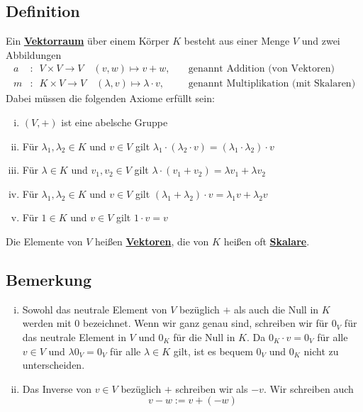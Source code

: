 \subsection{Definition}
Ein \underline{\textbf{Vektorraum}} über einem Körper $K$ besteht aus einer Menge $V$ und zwei Abbildungen
\begin{align*}
a &: \enspace V \times V \to V \quad (v,w) \mapsto v + w , \quad &\text{genannt Addition (von Vektoren)} \\
m &: \enspace K \times V \to V \quad (\lambda, v) \mapsto \lambda \cdot v  , \quad &\text{genannt Multiplikation (mit Skalaren)}
\end{align*}
Dabei müssen die folgenden Axiome erfüllt sein:
\begin{enumerate}[i)]
\item $(V,+)$ ist eine abelsche Gruppe

\item Für $\lambda_1 , \lambda_2 \in K$ und $v \in V$ gilt 
$\lambda_1 \cdot ( \lambda_2 \cdot v )=(\lambda_1 \cdot \lambda_2) \cdot v$

\item Für $\lambda \in K$ und $v_1, v_2 \in V$ gilt 
$\lambda \cdot ( v_1 + v_2 )= \lambda v_1 + \lambda v_2 $

\item Für $\lambda_1 , \lambda_2 \in K$ und $v \in V$ gilt 
$( \lambda_1 + \lambda_2 ) \cdot v = \lambda_1 v + \lambda_2 v$

\item Für $1 \in K$ und $v \in V$ gilt $1 \cdot v = v$
\end{enumerate}
Die Elemente von $V$ heißen \underline{\textbf{Vektoren}}, die von $K$ heißen oft \underline{\textbf{Skalare}}.

\subsection{Bemerkung}
\begin{enumerate}[i)]
\item Sowohl das neutrale Element von $V$ bezüglich $+$ als auch die Null in $K$ werden mit $0$ bezeichnet. Wenn wir ganz genau sind, schreiben wir für $0_V$ für das neutrale Element in $V$ und $0_K$ für die Null in $K$. Da $0_K \cdot v = 0_V$ für alle $v  \in V$ und $\lambda 0_V = 0_V$ für alle $\lambda \in K $ gilt, ist es bequem $0_V$ und $0_K$ nicht zu unterscheiden.

\item Das Inverse von $v \in V$ bezüglich $+$ schreiben wir als $-v$. Wir schreiben auch 
\[
v-w := v + (-w)
\]
\end{enumerate}


